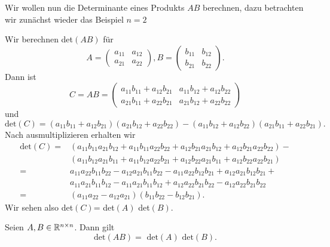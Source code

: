 Wir wollen nun die Determinante eines Produkts \(A B\) berechnen, dazu betrachten wir zunächst wieder das Beispiel \(n=2\)
\label{vektorraeume/LGS:example-16}
\begin{example}{}{}



Wir berechnen det\((AB)\) für
\begin{equation*}
 A = \left( \begin{matrix} a_{11} & a_{12} \\ a_{21} & a_{22}  \end{matrix} \right),  B = \left( \begin{matrix} b_{11} & b_{12} \\ b_{21} & b_{22}  \end{matrix} \right).
\end{equation*}
Dann ist
\begin{equation*}
 C = A B = \left( \begin{matrix} a_{11} b_{11} + a_{12} b_{21}   & a_{11} b_{12} + a_{12} b_{22} \\ a_{21} b_{11} + a_{22} b_{21}    & a_{21} b_{12} + a_{22} b_{22}   \end{matrix} \right)
\end{equation*}
und
\begin{equation*}
 \text{det}(C) = (a_{11} b_{11} + a_{12} b_{21}) (a_{21} b_{12} + a_{22} b_{22}) - (a_{11} b_{12} + a_{12} b_{22}) (a_{21} b_{11} + a_{22} b_{21}).
\end{equation*}
Nach ausmultiplizieren erhalten wir
\begin{align*}
  \text{det}(C) =& (a_{11} b_{11} a_{21} b_{12}  +  a_{11} b_{11} a_{22} b_{22} + a_{12} b_{21} a_{21} b_{12} +  a_{12} b_{21}a_{22} b_{22}) - \\& (a_{11} b_{12} a_{21} b_{11} + a_{11} b_{12}  a_{22} b_{21} + a_{12} b_{22} a_{21} b_{11} + a_{12} b_{22} a_{22} b_{21}) \\ =& a_{11} a_{22} b_{11}  b_{22} - a_{12} a_{21}   b_{11} b_{22}   -  a_{11} a_{22}  b_{12}  b_{21} +  a_{12}  a_{21} b_{12} b_{21}  +\\ &    a_{11} a_{21} b_{11}  b_{12} - a_{11} a_{21} b_{11}  b_{12}   +  a_{12} a_{22} b_{21} b_{22}  -  a_{12} a_{22} b_{21} b_{22}  \\=& (a_{11} a_{22} - a_{12} a_{21} )(b_{11}  b_{22}  - b_{12}  b_{21} ).
\end{align*}
Wir sehen also det\((C)\)= det\((A)\) det\((B)\).
\end{example}
\label{vektorraeume/LGS:theorem-17}
\begin{theorem}{}{}



Seien \(A,B \in \mathbb{R}^{n \times n}\). Dann gilt
\begin{equation*}
 \text{det}(AB) = \text{ det}(A) \text{ det}(B).
\end{equation*}\end{theorem}

